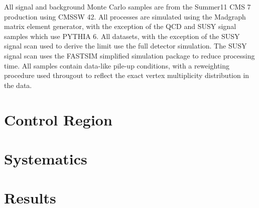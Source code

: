 

All signal and background Monte Carlo samples are from the Summer11 \ac{CMS}
\unit{7}{\TeV} production using \ac{CMSSW} 42. All processes are simulated using
the Madgraph matrix element generator, with the exception of the \ac{QCD} and
\ac{SUSY} signal samples which use \ac{PYTHIA} 6. All datasets, with the
exception of the \ac{SUSY} signal scan used to derive the limit use the full
detector simulation. The \ac{SUSY} signal scan uses the \ac{FASTSIM} simplified
simulation package to reduce processing time. All samples contain data-like
pile-up conditions, with a reweighting procedure used througout to reflect the
exact vertex multiplicity distribution in the data.


\section{Control Region}
\begin{figure}
\centering
{}\quad
{}\quad
{}
\caption[]{}
\label{fig:susy_mucontrol_kin}
\end{figure}

\begin{figure}
\centering
{}\quad
{}\quad
{}
\caption[]{}
\label{fig:susy_mucontrol_lp}
\end{figure}

\section{Systematics}
\label{sec:susy_systematics}



\section{Results}
\begin{figure}
\centering
{}\quad
{}\quad
{}\\
\quad
{}\quad
{}
\caption[]{}
\label{fig:susy_datamc}
\end{figure}

